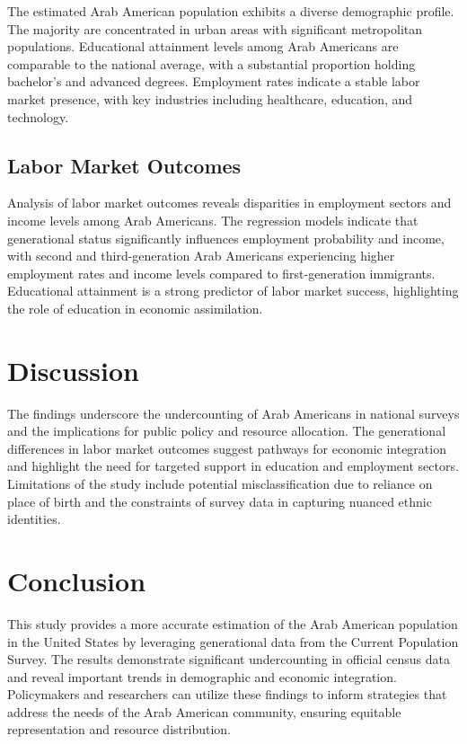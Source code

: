 The estimated Arab American population exhibits a diverse demographic profile. The majority are concentrated in urban areas with significant metropolitan populations. Educational attainment levels among Arab Americans are comparable to the national average, with a substantial proportion holding bachelor's and advanced degrees. Employment rates indicate a stable labor market presence, with key industries including healthcare, education, and technology.

\subsection{Labor Market Outcomes}\label{subsec:labor_market_outcomes}

Analysis of labor market outcomes reveals disparities in employment sectors and income levels among Arab Americans. The regression models indicate that generational status significantly influences employment probability and income, with second and third-generation Arab Americans experiencing higher employment rates and income levels compared to first-generation immigrants. Educational attainment is a strong predictor of labor market success, highlighting the role of education in economic assimilation.

\section{Discussion}\label{sec:discussion}

The findings underscore the undercounting of Arab Americans in national surveys and the implications for public policy and resource allocation. The generational differences in labor market outcomes suggest pathways for economic integration and highlight the need for targeted support in education and employment sectors. Limitations of the study include potential misclassification due to reliance on place of birth and the constraints of survey data in capturing nuanced ethnic identities.

\section{Conclusion}\label{sec:conclusion}

This study provides a more accurate estimation of the Arab American population in the United States by leveraging generational data from the Current Population Survey. The results demonstrate significant undercounting in official census data and reveal important trends in demographic and economic integration. Policymakers and researchers can utilize these findings to inform strategies that address the needs of the Arab American community, ensuring equitable representation and resource distribution.

